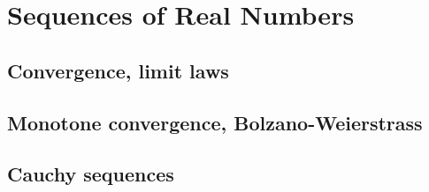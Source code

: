 
\section{Sequences of Real Numbers}

\subsection{Convergence, limit laws}


\subsection{Monotone convergence, Bolzano-Weierstrass}


\subsection{Cauchy sequences}

